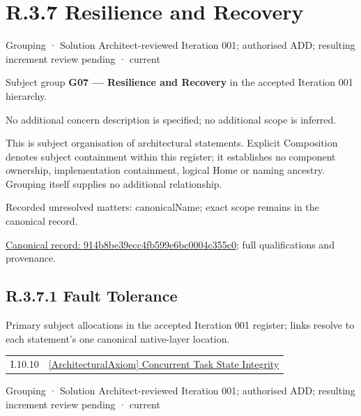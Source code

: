 \section*{R.3.7 Resilience and Recovery}
\label{navigation:R.3.7}

\label{element:914b8be39ecc4fb599e6bc0004c355c0}
{\small Grouping · Solution Architect-reviewed Iteration 001; authorised ADD; resulting increment review pending · current}\par

Subject group \textbf{G07 — Resilience and Recovery} in the accepted Iteration 001 hierarchy.



No additional concern description is specified; no additional scope is inferred.



This is subject organisation of architectural statements. Explicit Composition denotes subject containment within this register; it establishes no component ownership, implementation containment, logical Home or naming ancestry. Grouping itself supplies no additional relationship.


{\small Recorded unresolved matters: canonicalName; exact scope remains in the canonical record.}\par
{\footnotesize \href{../../../../continuum/grouping/914b8be39ecc4fb599e6bc0004c355c0.md}{Canonical record: 914b8be39ecc4fb599e6bc0004c355c0}; full qualifications and provenance.}\par
\subsection*{R.3.7.1 Fault Tolerance}
\label{navigation:R.3.7.1}

Primary subject allocations in the accepted Iteration 001 register; links resolve to each statement’s one canonical native-layer location.\par
\begin{longtable}{p{.22\linewidth}p{.73\linewidth}}
I.10.10 & \hyperref[element:26f3759e1d014a7cae5f265ea6530000]{[ArchitecturalAxiom] Concurrent Task State Integrity} \\
\end{longtable}
\label{element:0a59e0ebb33c494e939148d30e42f49c}
{\small Grouping · Solution Architect-reviewed Iteration 001; authorised ADD; resulting increment review pending · current}\par

